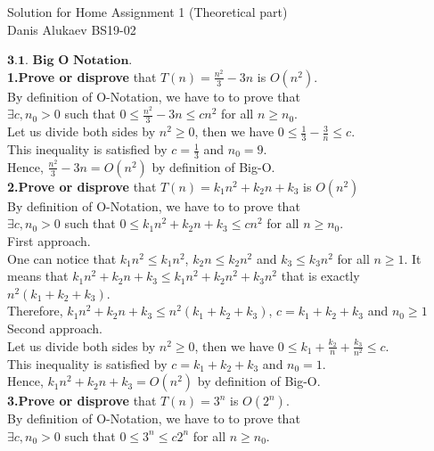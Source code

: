 \documentclass[11pt]{article}
\begin{document}
{\centering
  \large Solution for Home Assignment 1 (Theoretical part)\\
   Danis Alukaev BS19-02\\ \par
}

\bigbreak
\noindent $\textbf{3.1. Big O Notation}$.\\

\noindent \textbf{1.Prove or disprove} that $T(n)=\frac{n^{2}}{3}-3n$ is $O(n^{2})$.\\
By definition of O-Notation, we have to to prove that \\$\exists c, n_{0} > 0$ such that $0 \leq \frac{n^{2}}{3}-3n \leq cn^{2}$ for all $n \geq n_{0}$. \\
Let us divide both sides by $n^{2}\geq0$, then we have $0 \leq \frac{1}{3}-\frac{3}{n} \leq c$.\\
This inequality is satisfied by $c=\frac{1}{3}$ and $n_{0}=9$.\\
Hence, $\frac{n^{2}}{3}-3n=O(n^{2})$ by definition of Big-O.\\
\noindent \textbf{2.Prove or disprove} that $T(n)=k_{1}n^{2}+k_{2}n+k_{3}$ is $O(n^{2})$\\
By definition of O-Notation, we have to to prove that \\$\exists c, n_{0} > 0$ such that $0 \leq k_{1}n^{2}+k_{2}n+k_{3} \leq cn^{2}$ for all $n \geq n_{0}$.
\\
First approach.\\
One can notice that $k_{1}n^{2} \leq k_{1}n^{2}$, $k_{2}n \leq k_{2}n^{2}$ and $k_{3} \leq k_{3}n^{2}$ for all $n \geq 1$. It means that $k_{1}n^{2}+k_{2}n+k_{3} \leq k_{1}n^{2}+k_{2}n^{2}+k_{3}n^{2}$ that is exactly $n^{2}(k_{1}+k_{2}+k_{3})$.\\
Therefore, $k_{1}n^{2}+k_{2}n+k_{3} \leq n^{2}(k_{1}+k_{2}+k_{3})$, $c=k_{1}+k_{2}+k_{3}$ and $n_{0} \geq 1$\\ 
Second approach.\\
Let us divide both sides by $n^{2}\geq0$, then we have $0 \leq k_{1}+\frac{k_{2}}{n}+\frac{k_{3}}{n^{2}} \leq c$.\\
This inequality is satisfied by $c=k_{1}+k_{2}+k_{3}$ and $n_{0}=1$.\\
Hence, $k_{1}n^{2}+k_{2}n+k_{3}=O(n^{2})$ by definition of Big-O.\\
\noindent \textbf{3.Prove or disprove} that $T(n)=3^{n}$ is $O(2^{n})$.\\
By definition of O-Notation, we have to to prove that \\$\exists c, n_{0} > 0$ such that $0 \leq 3^{n} \leq c2^{n}$ for all $n \geq n_{0}$. \\
\end{document}
